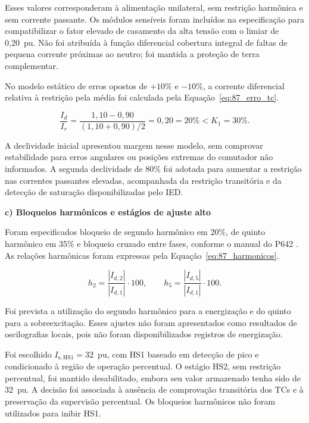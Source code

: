 Esses valores corresponderam à alimentação unilateral, sem restrição harmônica e sem corrente passante. Os módulos sensíveis foram incluídos na especificação para compatibilizar o fator elevado de casamento da alta tensão com o limiar de 0,20~pu. Não foi atribuída à função diferencial cobertura integral de faltas de pequena corrente próximas ao neutro; foi mantida a proteção de terra complementar.

No modelo estático de erros opostos de $+10\%$ e $-10\%$, a corrente diferencial relativa à restrição pela média foi calculada pela Equação~\eqref{eq:87_erro_tc}.

\begin{equation}
    \frac{I_d}{I_r}
    =\frac{1{,}10-0{,}90}{(1{,}10+0{,}90)/2}
    =0{,}20=20\%<K_1=30\%.
    \label{eq:87_erro_tc}
\end{equation}

A declividade inicial apresentou margem nesse modelo, sem comprovar estabilidade para erros angulares ou posições extremas do comutador não informados. A segunda declividade de 80\% foi adotada para aumentar a restrição nas correntes passantes elevadas, acompanhada da restrição transitória e da detecção de saturação disponibilizadas pelo IED.

\textbf{c) Bloqueios harmônicos e estágios de ajuste alto}

Foram especificados bloqueio de segundo harmônico em 20\%, de quinto harmônico em 35\% e bloqueio cruzado entre fases, conforme o manual do P642 \cite{gev2025p64x}. As relações harmônicas foram expressas pela Equação~\eqref{eq:87_harmonicos}.

\begin{equation}
    h_2=\frac{|I_{d,2}|}{|I_{d,1}|}\cdot100,
    \qquad h_5=\frac{|I_{d,5}|}{|I_{d,1}|}\cdot100.
    \label{eq:87_harmonicos}
\end{equation}

Foi prevista a utilização do segundo harmônico para a energização e do quinto para a sobreexcitação. Esses ajustes não foram apresentados como resultados de oscilografias locais, pois não foram disponibilizados registros de energização.

Foi escolhido $I_{\mathrm{s,HS1}}=32$~pu, com HS1 baseado em detecção de pico e condicionado à região de operação percentual. O estágio HS2, sem restrição percentual, foi mantido desabilitado, embora seu valor armazenado tenha sido de 32~pu. A decisão foi associada à ausência de comprovação transitória dos TCs e à preservação da supervisão percentual. Os bloqueios harmônicos não foram utilizados para inibir HS1.

